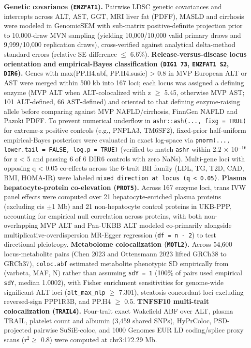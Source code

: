 \textbf{Genetic covariance (\texttt{ENZFAT1}).} Pairwise LDSC genetic covariances and intercepts across ALT, AST, GGT, MRI liver fat (PDFF), MASLD and cirrhosis were modeled in GenomicSEM with sub-matrix positive-definite projection prior to 10,000-draw MVN sampling (yielding 10,000/10,000 valid primary draws and 9,999/10,000 replication draws), cross-verified against analytical delta-method standard errors (relative SE difference $\le$ 6.6\%). \textbf{Release-versus-disease locus orientation and empirical-Bayes classification (\texttt{DIG1 73}, \texttt{ENZFAT1 S2}, \texttt{DIR6}).} Genes with max(PP.H4.abf, PP.H4.susie) \textgreater{} 0.8 in MVP European ALT or AST were merged within 500 kb into 167 loci; each locus was assigned a defining enzyme (MVP ALT when ALT-colocalized with \textbar z\textbar{} $\ge$ 5.45, otherwise MVP AST; 101 ALT-defined, 66 AST-defined) and oriented to that defining enzyme-raising allele before comparing against MVP NAFLD/cirrhosis, FinnGen NAFLD and Pazoki PDFF. To prevent numerical underflow in \texttt{ashr::ash(..., fixg = TRUE)} for extreme-z positive controls (e.g., PNPLA3, TM6SF2), fixed-prior half-uniform empirical-Bayes posteriors were evaluated in exact log-space via \texttt{pnorm(..., lower.tail = FALSE, log.p = TRUE)} (verified to match \texttt{ashr} within 2.2 $\times$ 10$^{-16}$ for \textbar z\textbar{} \textless{} 5 and passing 6 of 6 DIR6 controls with zero NaNs). Multi-gene loci with opposing q \textless{} 0.05 co-effects across the 6-trait BH family (LDL, TG, T2D, CAD, BMI, HOMA-IR) were labeled \texttt{mixed direction at locus (q < 0.05)}. \textbf{Plasma hepatocyte-protein co-elevation (\texttt{PROT5}).} Across 167 enzyme loci, trans IVW panel effects were computed over 21 hepatocyte-enriched plasma proteins (excluding cis $\pm$1 Mb) and 21 non-hepatocyte control proteins in UKB-PPP, accounting for empirical null correlation across proteins, with both non-overlapping MVP ALT and Pan-UKBB ALT modeled co-primarily alongside multiplicative-overdispersion MR-Egger regression (\texttt{df = n - 2}) to test directional pleiotropy. \textbf{Metabolome colocalization (\texttt{MQTL2}).} Across 54,600 locus-metabolite pairs (Chen 2023 and Ottensmann 2023 lifted GRCh38 to GRCh37), \texttt{coloc.abf} estimated metabolite phenotypic SD empirically from (varbeta, MAF, N) rather than assuming \texttt{sdY = 1} (100\% of pairs used empirical \texttt{sdY}, median 1.0002), with Fisher enrichment sensitivities for genome-wide significant ALT loci (\texttt{alt\_max\_nlp} $\ge$ 7.301), steatosis-concordant loci excluding reversed-sign PPP1R3B, and PP.H4 $\ge$ 0.5. \textbf{TNFSF10 multi-trait colocalization (\texttt{TRAIL4}).} Four-trait exact Wakefield ABF over ALT, plasma TRAIL, platelet count and albumin (3,459 shared SNPs), HyPrColoc, PSD-projected pairwise SuSiE-coloc, and 1000 Genomes EUR LD coding/splice proxy scans (r$^2 \ge$ 0.8) were computed at chr3:172.29 Mb.

